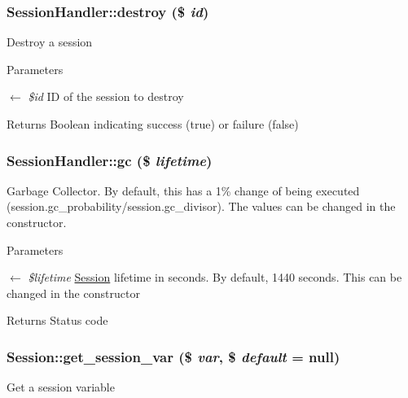 \subsubsection[{destroy}]{\setlength{\rightskip}{0pt plus 5cm}SessionHandler::destroy (\$ {\em id})}\label{classSessionHandler_a4e43712ef307979de1b12039ef801adb}
Destroy a session


\begin{DoxyParams}{Parameters}
\item[\mbox{$\leftarrow$} {\em \$id}]ID of the session to destroy \end{DoxyParams}
\begin{DoxyReturn}{Returns}
Boolean indicating success (true) or failure (false) 
\end{DoxyReturn}
\subsubsection[{gc}]{\setlength{\rightskip}{0pt plus 5cm}SessionHandler::gc (\$ {\em lifetime})}\label{classSessionHandler_ac33097332375ae3f8a43c31cef6db0e8}
Garbage Collector. By default, this has a 1\% change of being executed (session.gc\_\-probability/session.gc\_\-divisor). The values can be changed in the constructor.


\begin{DoxyParams}{Parameters}
\item[\mbox{$\leftarrow$} {\em \$lifetime}]\hyperlink{classSession}{Session} lifetime in seconds. By default, 1440 seconds. This can be changed in the constructor \end{DoxyParams}
\begin{DoxyReturn}{Returns}
Status code 
\end{DoxyReturn}
\subsubsection[{get\_\-session\_\-var}]{\setlength{\rightskip}{0pt plus 5cm}Session::get\_\-session\_\-var (\$ {\em var}, \/  \$ {\em default} = {\ttfamily null})}\label{classSession_a5848ed72d1718b1e4fd11e66972e88bc}
Get a session variable


